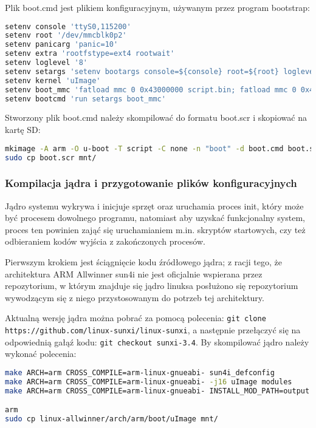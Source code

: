 \par

Plik boot.cmd jest plikiem konfiguracyjnym, używanym przez program bootstrap:

\begin{lstlisting}[language=bash]
setenv console 'ttyS0,115200'
setenv root '/dev/mmcblk0p2'
setenv panicarg 'panic=10'
setenv extra 'rootfstype=ext4 rootwait'
setenv loglevel '8'
setenv setargs 'setenv bootargs console=${console} root=${root} loglevel=${loglevel} ${panicarg} ${extra}'
setenv kernel 'uImage'
setenv boot_mmc 'fatload mmc 0 0x43000000 script.bin; fatload mmc 0 0x48000000 ${kernel}; bootm 0x48000000'
setenv bootcmd 'run setargs boot_mmc'
\end{lstlisting}

Stworzony plik boot.cmd należy skompilować do formatu boot.scr i skopiować na kartę SD:

\begin{lstlisting}[language=bash]
mkimage -A arm -O u-boot -T script -C none -n "boot" -d boot.cmd boot.scr
sudo cp boot.scr mnt/
\end{lstlisting}


\subsubsection{Kompilacja jądra i przygotowanie plików konfiguracyjnych}

Jądro systemu wykrywa i inicjuje sprzęt oraz uruchamia proces init, który może być procesem dowolnego programu, natomiast aby uzyskać funkcjonalny system, proces ten powinien zająć się uruchamianiem m.in. skryptów startowych, czy też odbieraniem kodów wyjścia z zakończonych procesów.

Pierwszym krokiem jest ściągnięcie kodu źródłowego jądra; z racji tego, że architektura ARM Allwinner sun4i nie jest oficjalnie wspierana przez repozytorium, w którym znajduje się jądro linuksa posłużono się repozytorium wywodzącym się z niego przystosowanym do potrzeb tej architektury.

Aktualną wersję jądra można pobrać za pomocą polecenia: \lstinline{git clone https://github.com/linux-sunxi/linux-sunxi}, a następnie przełączyć się na odpowiednią gałąź kodu: \lstinline{git checkout sunxi-3.4}. By skompilować jądro należy wykonać polecenia:

\begin{lstlisting}[language=bash]
make ARCH=arm CROSS_COMPILE=arm-linux-gnueabi- sun4i_defconfig
make ARCH=arm CROSS_COMPILE=arm-linux-gnueabi- -j16 uImage modules
make ARCH=arm CROSS_COMPILE=arm-linux-gnueabi- INSTALL_MOD_PATH=output modules_install

arm
sudo cp linux-allwinner/arch/arm/boot/uImage mnt/
\end{lstlisting}

